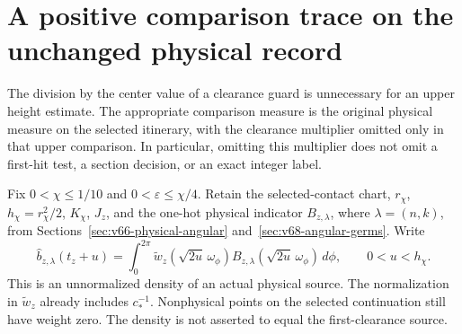 \section{A positive comparison trace on the unchanged physical record}
\label{sec:v69-comparison-trace}
The division by the center value of a clearance guard is unnecessary
for an upper height estimate. The appropriate comparison measure is
the original physical measure on the selected itinerary, with the
clearance multiplier omitted only in that upper comparison. In
particular, omitting this multiplier does not omit a first-hit test,
a section decision, or an exact integer label.

Fix $0<\chi\le1/10$ and $0<\varepsilon\le\chi/4$. Retain the
selected-contact chart, $r_\chi$, $h_\chi=r_\chi^2/2$, $K_\chi$,
$J_z$, and the one-hot physical indicator $B_{z,\lambda}$, where
$\lambda=(n,k)$, from Sections~\ref{sec:v66-physical-angular}
and~\ref{sec:v68-angular-germs}. Write
\begin{equation}\label{eq:v69-comparison-density}
 \widehat b_{z,\lambda}(t_z+u)=
 \int_0^{2\pi}\widetilde w_z(\sqrt{2u}\,\omega_\phi)
              B_{z,\lambda}(\sqrt{2u}\,\omega_\phi)\,d\phi,
 \qquad 0<u<h_\chi.
\end{equation}
This is an unnormalized density of an actual physical source. The
normalization in $\widetilde w_z$ already includes $c_*^{-1}$.
Nonphysical points on the selected continuation still have weight
zero. The density is not asserted to equal the first-clearance source.

